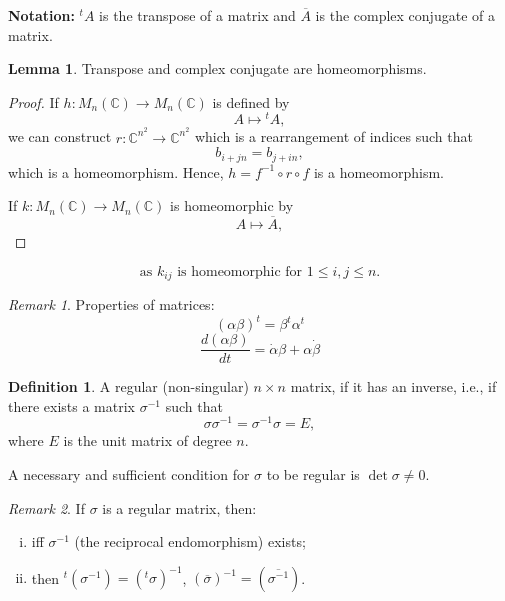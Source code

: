 \documentclass[11pt]{article}
\theoremstyle{definition}
\newtheorem{definition}{Definition}[section]
\newtheorem{lemma}{Lemma}[section]
\theoremstyle{remark}
\newtheorem{remark}{Remark}[section]
\begin{document}
\textbf{Notation:} \( {}^t\!A \) is the transpose of a matrix and \( \overline{A} \) is the complex conjugate of a matrix.

\begin{lemma}
Transpose and complex conjugate are homeomorphisms.
\end{lemma}

\begin{proof}
If \( h: M_n(\mathbb{C}) \to M_n(\mathbb{C}) \) is defined by
\[
A \mapsto {}^t\!A,
\]
we can construct \( r: \mathbb{C}^{n^2} \to \mathbb{C}^{n^2} \) which is a rearrangement of indices such that
\[
b_{i+j n} = b_{j+i n},
\]
which is a homeomorphism. Hence, \( h = f^{-1} \circ r \circ f \) is a homeomorphism.

If \( k: M_n(\mathbb{C}) \to M_n(\mathbb{C}) \) is homeomorphic by
\[
A \mapsto \overline{A},
\]
\end{proof}

\[
\text{as } k_{ij} \text{ is homeomorphic for } 1 \leq i,j \leq n.
\]

\begin{remark}
Properties of matrices:
\[
(\alpha \beta)^t = \beta^t \alpha^t
\]
\[
\frac{d(\alpha \beta)}{dt} = \dot{\alpha} \beta + \alpha \dot{\beta}
\]
\end{remark}

\begin{definition}\label{def:regular_matrix}
A regular (non-singular) \( n \times n \) matrix, if it has an inverse, i.e., if there exists a matrix \( \sigma^{-1} \) such that
\[
\sigma \sigma^{-1} = \sigma^{-1} \sigma = E,
\]
where \( E \) is the unit matrix of degree \( n \).

A necessary and sufficient condition for \( \sigma \) to be regular is \( \det \sigma \neq 0 \).
\end{definition}

\begin{remark}\label{rem:regular_matrix_properties}
If \( \sigma \) is a regular matrix, then:
\begin{enumerate}[(i)]
    \item iff \( \sigma^{-1} \) (the reciprocal endomorphism) exists;
    \item then \( {}^{t}(\sigma^{-1}) = (^{t}\sigma)^{-1} \), \( (\overline{\sigma})^{-1} = (\overline{\sigma^{-1}}) \).
\end{enumerate}
\end{remark}
\end{document}
